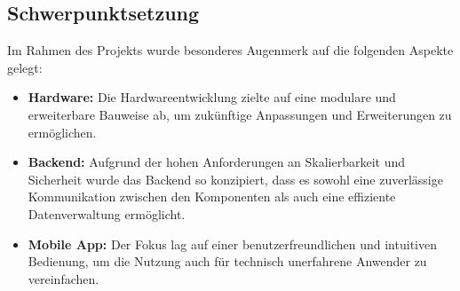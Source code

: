 \subsection{Schwerpunktsetzung}

Im Rahmen des Projekts wurde besonderes Augenmerk auf die folgenden Aspekte gelegt:

\begin{itemize}
  \item \textbf{Hardware:} Die Hardwareentwicklung zielte auf eine modulare und erweiterbare Bauweise ab, um zukünftige Anpassungen und Erweiterungen zu ermöglichen.
  \item \textbf{Backend:} Aufgrund der hohen Anforderungen an Skalierbarkeit und Sicherheit wurde das Backend so konzipiert, dass es sowohl eine zuverlässige Kommunikation zwischen den Komponenten als auch eine effiziente Datenverwaltung ermöglicht.
  \item \textbf{Mobile App:} Der Fokus lag auf einer benutzerfreundlichen und intuitiven Bedienung, um die Nutzung auch für technisch unerfahrene Anwender zu vereinfachen.
\end{itemize}
